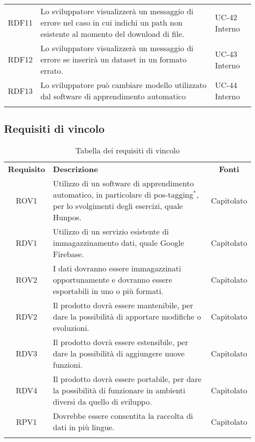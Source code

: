\begin{tabularx}{\textwidth}{| c | p{10cm} | X |}
		RDF11 & Lo sviluppatore visualizzerà un messaggio di errore nel caso in cui indichi un path non esistente al momento del download di file. & UC-42 \newline Interno\\
		RDF12 & Lo sviluppatore visualizzerà un messaggio di errore se inserirà un dataset in un formato errato. & UC-43 \newline Interno\\
		RDF13 & Lo sviluppatore può cambiare modello utilizzato dal software di apprendimento automatico & UC-44 \newline Interno\\
		\hline
		\caption{Tabella dei requisiti funzionali}
\end{tabularx}

\subsection{Requisiti di vincolo}
\begin{longtable}{| c | p{10cm} | c |}
		\rowcolor{LightBlue}
		\color{white}\bfseries Requisito & \color{white}\bfseries Descrizione & \color{white}\bfseries Fonti\\[0.25cm]
		ROV1 & Utilizzo di un software di apprendimento automatico, in particolare di pos-tagging$^*$, per lo svolgimenti degli esercizi, quale Hunpos. & Capitolato \\
		RDV1 & Utilizzo di un servizio esistente di immagazzinamento dati, quale Google Firebase. & Capitolato \\
		ROV2 & I dati dovranno essere immagazzinati opportunamente e dovranno essere esportabili in uno o più formati. & Capitolato \\
		RDV2 & Il prodotto dovrà essere mantenibile, per dare la possibilità di apportare modifiche o evoluzioni. & Capitolato \\
		RDV3 & Il prodotto dovrà essere estensibile, per dare la possibilità di aggiungere nuove funzioni. & Capitolato \\
		RDV4 & Il prodotto dovrà essere  portabile, per dare la possibilità di funzionare in ambienti diversi da quello di sviluppo. & Capitolato \\
		RPV1 & Dovrebbe essere consentita la raccolta di dati in più lingue. & Capitolato \\ \hline
		\caption{Tabella dei requisiti di vincolo}
\end{longtable}

